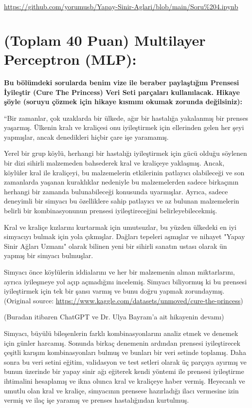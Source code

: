 \documentclass[11pt]{article}
\begin{document}
\url{https://github.com/yorumusb/Yapay-Sinir-Aglari/blob/main/Soru%204.ipynb}

\section{(Toplam 40 Puan) Multilayer Perceptron (MLP):} 
\textbf{Bu bölümdeki sorularda benim vize ile beraber paylaştığım Prensesi İyileştir (Cure The Princess) Veri Seti parçaları kullanılacak. Hikaye şöyle (soruyu çözmek için hikaye kısmını okumak zorunda değilsiniz):} 

``Bir zamanlar, çok uzaklarda bir ülkede, ağır bir hastalığa yakalanmış bir prenses yaşarmış. Ülkenin kralı ve kraliçesi onu iyileştirmek için ellerinden gelen her şeyi yapmışlar, ancak denedikleri hiçbir çare işe yaramamış.

Yerel bir grup köylü, herhangi bir hastalığı iyileştirmek için gücü olduğu söylenen bir dizi sihirli malzemeden bahsederek kral ve kraliçeye yaklaşmış. Ancak, köylüler kral ile kraliçeyi, bu malzemelerin etkilerinin patlayıcı olabileceği ve son zamanlarda yaşanan kuraklıklar nedeniyle bu malzemelerden sadece birkaçının herhangi bir zamanda bulunabileceği konusunda uyarmışlar. Ayrıca, sadece deneyimli bir simyacı bu özelliklere sahip patlayıcı ve az bulunan malzemelerin belirli bir kombinasyonunun prensesi iyileştireceğini belirleyebilecekmiş.

Kral ve kraliçe kızlarını kurtarmak için umutsuzlar, bu yüzden ülkedeki en iyi simyacıyı bulmak için yola çıkmışlar. Dağları tepeleri aşmışlar ve nihayet "Yapay Sinir Ağları Uzmanı" olarak bilinen yeni bir sihirli sanatın ustası olarak ün yapmış bir simyacı bulmuşlar.

Simyacı önce köylülerin iddialarını ve her bir malzemenin alınan miktarlarını, ayrıca iyileşmeye yol açıp açmadığını incelemiş. Simyacı biliyormuş ki bu prensesi iyileştirmek için tek bir şansı varmış ve bunu doğru yapmak zorundaymış. (Original source: \url{https://www.kaggle.com/datasets/unmoved/cure-the-princess})

(Buradan itibaren ChatGPT ve Dr. Ulya Bayram'a ait hikayenin devamı)

Simyacı, büyülü bileşenlerin farklı kombinasyonlarını analiz etmek ve denemek için günler harcamış. Sonunda birkaç denemenin ardından prensesi iyileştirecek çeşitli karışım kombinasyonları bulmuş ve bunları bir veri setinde toplamış. Daha sonra bu veri setini eğitim, validasyon ve test setleri olarak üç parçaya ayırmış ve bunun üzerinde bir yapay sinir ağı eğiterek kendi yöntemi ile prensesi iyileştirme ihtimalini hesaplamış ve ikna olunca kral ve kraliçeye haber vermiş. Heyecanlı ve umutlu olan kral ve kraliçe, simyacının prensese hazırladığı ilacı vermesine izin vermiş ve ilaç işe yaramış ve prenses hastalığından kurtulmuş.
\end{document}
